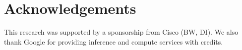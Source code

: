 
\section{Acknowledgements}
\label{sec-ack}
This research was supported by a sponsorship from Cisco (BW, DI).
We also thank Google for providing inference and compute services with credits.
